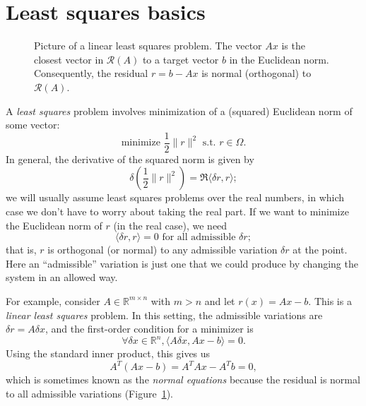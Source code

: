 \documentclass[12pt, leqno]{article} %
\begin{document}

\section{Least squares basics}

\begin{figure}
  \begin{center}
  \end{center}
  \caption{Picture of a linear least squares problem.  The vector $Ax$
           is the closest vector in $\mathcal{R}(A)$ to a target
           vector $b$ in the Euclidean norm.  Consequently, the
           residual $r = b-Ax$ is normal (orthogonal) to
           $\mathcal{R}(A)$.}
  \label{fig1}
\end{figure}

A {\em least squares} problem involves minimization of a (squared)
Euclidean norm of some vector:
\[
  \mbox{minimize } \frac{1}{2} \|r\|^2 \mbox{ s.t. } r \in \Omega.
\]
In general, the derivative of the squared norm is given by
\[
  \delta \left( \frac{1}{2} \|r\|^2 \right) = \Re \langle \delta r, r \rangle;
\]
we will usually assume least squares problems over the real numbers,
in which case we don't have to worry about taking the real part.
If we want to minimize the Euclidean norm of $r$ (in the real case), we need
\[
  \langle \delta r, r \rangle = 0 \mbox{ for all admissible } \delta r;
\]
that is, $r$ is orthogonal (or normal) to any admissible variation
$\delta r$ at the point.  Here an ``admissible'' variation is just one
that we could produce by changing the system in an allowed way.

For example, consider $A \in \mathbb{R}^{m \times n}$ with $m > n$ and
let $r(x) = A x - b$.  This is a {\em linear least squares} problem.
In this setting, the admissible variations are $\delta r = A \delta
x$, and the first-order condition for a minimizer is
\[
  \forall \delta x \in \mathbb{R}^n, \langle A \delta x, Ax - b \rangle = 0.
\]
Using the standard inner product, this gives us
\[
  A^T (Ax - b) = A^T A x - A^T b = 0,
\]
which is sometimes known as the {\em normal equations} because the
residual is normal to all admissible variations (Figure~\ref{fig1}).
\end{document}
